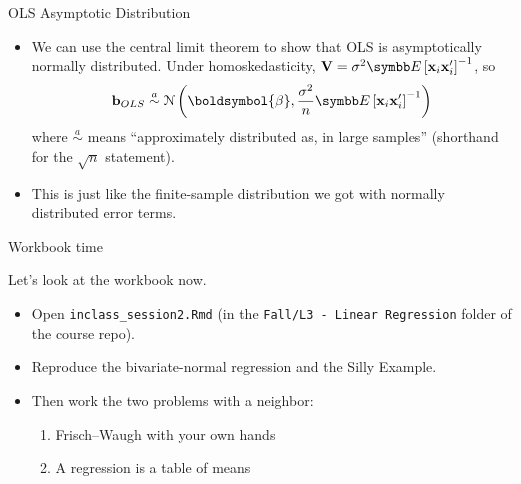\documentclass[aspectratio=169,11pt]{beamer}
\begin{document}
\begin{frame}{OLS Asymptotic Distribution}
\begin{itemize}
	\item We can use the central limit theorem to show that OLS is asymptotically
	normally distributed. Under homoskedasticity, ${\bf V} = \sigma^{2}\E\left[{\bf x}_{i}{\bf x}_{i}'\right]^{-1}$, so\[
{\bf b}_{OLS}\overset{a}{\sim}\mathcal{N}\left(\boldsymbol{\beta},\frac{\sigma^{2}}{n}\E\left[{\bf x}_{i}{\bf x}_{i}'\right]^{-1}\right)
\]
	where $\overset{a}{\sim}$ means ``approximately distributed as, in large samples'' (shorthand for the $\sqrt{n}$ statement). 

	\item This is just like the finite-sample distribution
	we got with normally distributed error terms.
\end{itemize}
\end{frame}


\begin{frame}{Workbook time}
\begin{center}
{\LARGE \alert{Let's look at the workbook now.}}
\end{center}
\bigskip
\begin{itemize}
	\item Open \texttt{inclass\_session2.Rmd} (in the \texttt{Fall/L3 - Linear Regression} folder of the course repo).
	\item Reproduce the bivariate-normal regression and the Silly Example.
	\item Then work the two problems with a neighbor:
	\begin{enumerate}
		\item Frisch--Waugh with your own hands
		\item A regression is a table of means
	\end{enumerate}
\end{itemize}
\end{frame}
\end{document}
